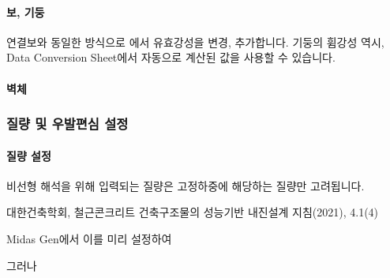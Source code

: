 \documentclass[a4paper,10pt,korean]{sphinxmanual}
\begin{document}
\paragraph{보, 기둥}
\label{\detokenize{1_stiffness_setting:id4}}
\sphinxAtStartPar
연결보와 동일한 방식으로  에서 유효강성을 변경, 추가합니다.
기둥의 휨강성 역시, Data Conversion Sheet에서 자동으로 계산된 값을 사용할 수 있습니다.


\paragraph{벽체}
\label{\detokenize{1_stiffness_setting:id5}}
\sphinxstepscope


\subsubsection{질량 및 우발편심 설정}
\label{\detokenize{1_mass_ecc_setting:id1}}\label{\detokenize{1_mass_ecc_setting::doc}}

\paragraph{질량 설정}
\label{\detokenize{1_mass_ecc_setting:id2}}
\sphinxAtStartPar
비선형 해석을 위해 입력되는 질량은 고정하중에 해당하는 질량만 고려됩니다.%
\begin{footnote}[1]\sphinxAtStartFootnote
대한건축학회, 철근콘크리트 건축구조물의 성능기반 내진설계 지침(2021), 4.1\sphinxhyphen{}(4)
%
\end{footnote}
Midas Gen에서 이를 미리 설정하여

\sphinxAtStartPar
그러나
\end{document}
